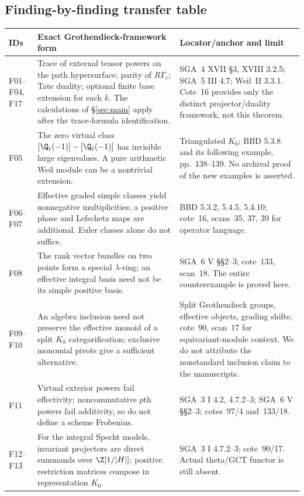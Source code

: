 \subsection{Finding-by-finding transfer table}
{\small\begin{longtable}{p{.12\linewidth}p{.48\linewidth}p{.32\linewidth}}
\toprule IDs&Exact Grothendieck-framework form&Locator/anchor and limit\\\midrule\endhead
F01--F04, F17&Trace of external tensor powers on the path hypersurface; parity of $R\Gamma_c$; Tate duality; optional finite base extension for each $k$. The calculations of \S\ref{sec:main} apply after the trace-formula identification.&SGA~4 XVII \S3, XVIII 3.2.5; SGA~5 III 4.7; Weil~II 3.3.1. Cote~16 provides only the distinct projector/duality framework, not this theorem.\\
F05&The zero virtual class $[\Q_\ell(-1)]-[\Q_\ell(-1)]$ has invisible large eigenvalues. A pure arithmetic Weil module can be a nontrivial extension.&Triangulated $K_0$; BBD 5.3.8 and its following example, pp.~138--139. No archival proof of the new examples is asserted.\\
F06--F07&Effective graded simple classes yield nonnegative multiplicities; a positive phase and Lefschetz maps are additional. Euler classes alone do not suffice.&BBD 5.3.2, 5.4.5, 5.4.10; cote~16, scans~35, 37, 39 for operator language.\\
F08&The rank vector bundles on two points form a special $\lambda$-ring; an effective integral basis need not be its simple positive basis.&SGA~6 V \S\S2--3; cote~133, scan~18. The entire counterexample is proved here.\\
F09--F10&An algebra inclusion need not preserve the effective monoid of a split $K_0$ categorification; exclusive monomial pivots give a sufficient alternative.&Split Grothendieck groups, effective objects, grading shifts; cote~90, scan~17 for equivariant-module context. We do not attribute the nonstandard inclusion claim to the manuscripts.\\
F11&Virtual exterior powers fail effectivity; noncommutative $p$th powers fail additivity, so do not define a scheme Frobenius.&SGA~3 I 4.2, 4.7.2--3; SGA~6 V \S\S2--3; cotes~97/4 and~133/18.\\
F12--F13&For the integral Specht models, invariant projectors are direct summands over $\Z[1/|H|]$; positive restriction matrices compose in representation $K_0$.&SGA~3 I 4.7.2--3; cote~90/17. Actual theta/GCT functor is still absent.\\

\end{longtable}}
